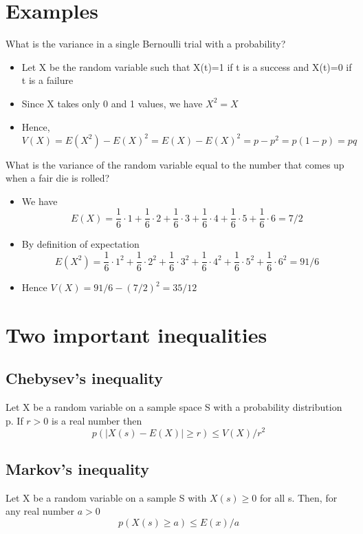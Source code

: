 \documentclass{article}[18pt]
\begin{document}
\section{Examples}
What is the variance in a single Bernoulli trial with a probability?
\begin{itemize}
	\item Let X be the random variable such that X(t)=1 if t is a success and X(t)=0 if t is a failure
	\item Since X takes only 0 and 1 values, we have $X^2=X$
	\item Hence, $V ( X ) = E \left( X ^ { 2 } \right) - E ( X ) ^ { 2 } = E ( X ) - E ( X ) ^ { 2 } = p - p ^ { 2 } = p ( 1 - p ) = p q$
\end{itemize}
What is the variance of the random variable equal to the number that comes up when a fair die is rolled?
\begin{itemize}
	\item We have
$$E ( X ) = \frac { 1 } { 6 } \cdot 1 + \frac { 1 } { 6 } \cdot 2 + \frac { 1 } { 6 } \cdot 3 + \frac { 1 } { 6 } \cdot 4 + \frac { 1 } { 6 } \cdot 5 + \frac { 1 } { 6 } \cdot 6 = 7 / 2$$
	\item By definition of expectation
$$E \left( X ^ { 2 } \right) = \frac { 1 } { 6 } \cdot 1 ^ { 2 } + \frac { 1 } { 6 } \cdot 2 ^ { 2 } + \frac { 1 } { 6 } \cdot 3 ^ { 2 } + \frac { 1 } { 6 } \cdot 4 ^ { 2 } + \frac { 1 } { 6 } \cdot 5 ^ { 2 } + \frac { 1 } { 6 } \cdot 6 ^ { 2 } = 91 / 6$$
\item Hence $V ( X ) = 91 / 6 - ( 7 / 2 ) ^ { 2 } = 35 / 12$
\end{itemize}
\section{Two important inequalities}
\subsection{Chebysev's inequality}
Let X be a random variable on a sample space S with a probability distribution p. If $r>0$ is a real number then
$$p ( | X ( s ) - E ( X ) | \geq r ) \leq V ( X ) / r ^ { 2 }$$
\subsection{Markov's inequality}
Let X be a random variable on a sample S with $X(s)\geqslant 0$ for all s. Then, for any real number $a>0$
$$p ( X ( s ) \geq a ) \leq E ( x ) / a$$
\end{document}
